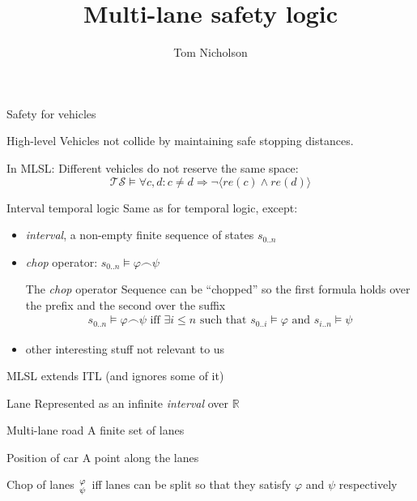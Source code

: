 \documentclass[xcolor=table]{beamer}
\title[Coordinated Autonomous Vehicle Safety]{Multi-lane safety logic}
\author{Tom Nicholson}
\institute{Seoul National University}
\begin{document}
		
	\frame{\titlepage}
	
\begin{frame}{Safety for vehicles}
\begin{block}{High-level}
	Vehicles not collide by maintaining safe stopping distances.
\end{block}
\pause
\bigskip
\bigskip
\begin{block}{In MLSL:}
	Different vehicles do not reserve the same space:
	\pause
	\begin{equation*}
	\mathcal{TS} \models \forall c, d: c \ne d \Rightarrow \neg \langle re(c) \land re(d)\rangle
	\end{equation*}
\end{block}

\end{frame}



\begin{frame}{Interval temporal logic}
Same as for temporal logic, except:

\begin{itemize}
	\item \textit{interval}, a non-empty finite sequence of states $s_{0..n}$
	\pause
	\item \textit{chop} operator: $s_{0..n} \models \varphi \frown \psi$
	\begin{block}{The \textit{chop} operator}
		Sequence can be ``chopped'' so the first formula holds over the prefix and the second over the suffix
		\begin{gather*}
		s_{0..n} \models \varphi \frown \psi \text{  iff  } \exists i \le n \text{   such that    } s_{0..i} \models \varphi \text{ and } s_{i..n} \models \psi
		\end{gather*}
		
	\end{block}
	\pause
	\item other interesting stuff not relevant to us
\end{itemize}

\end{frame}  

\begin{frame}{MLSL extends ITL (and ignores some of it)}

\begin{block}{Lane}
	Represented as an infinite \textit{interval} over $\mathbb{R}$
\end{block}
\pause
\begin{block}{Multi-lane road}
	A finite set of lanes
\end{block}
\pause
\begin{block}{Position of car}
	A point along the lanes
\end{block}
\pause
\begin{block}{Chop of lanes}
	$\varphi \atop \psi$ iff lanes can be split so that they satisfy $\varphi$ and $\psi$ respectively
\end{block}


\end{frame}
\end{document}
